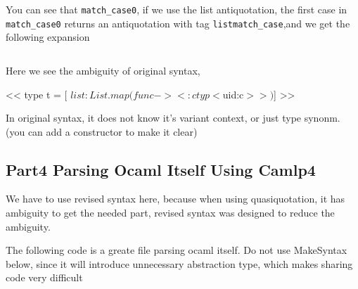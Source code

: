 You can see that \verb|match_case0|, if we use the list antiquotation,
the first case in \verb|match_case0| returns an antiquotation with tag
\verb|listmatch_case|,and we get the following expansion


\inputminted[fontsize=\scriptsize, ]{ocaml}{camlp4/code/jake/antiquot_expander.ml}

Here we see the ambiguity of original syntax,

\begin{bluetext}
<< type t = [ $list:List.map (fun c -> <:ctyp< $uid:c$ >>)$]  >>
\end{bluetext}

In original syntax, it does not know it's variant context, or just
type synonm. (you can add a constructor to make it clear)

\subsection{Part4 Parsing Ocaml Itself Using Camlp4}

We have to use revised syntax here, because when using quasiquotation,
it has ambiguity to get the needed part, revised syntax was designed
to reduce the ambiguity. 

The following code is a greate file parsing ocaml itself.
Do not use MakeSyntax below, since it will introduce unnecessary
abstraction type, which makes sharing code very difficult

\inputminted[fontsize=\scriptsize, ]{ocaml}{camlp4/code/jake/otags.ml}


